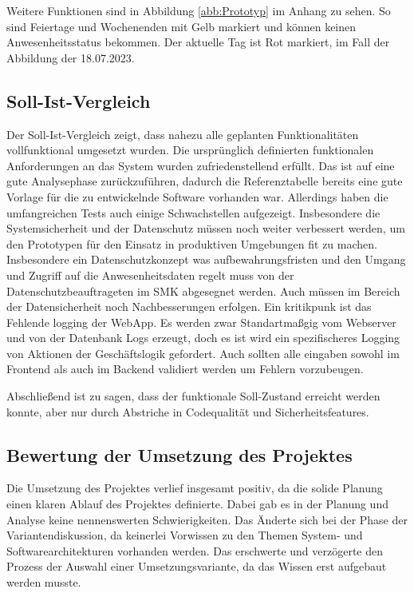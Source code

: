 Weitere Funktionen sind in Abbildung \ref{abb:Prototyp} im Anhang zu sehen. So sind \zB Feiertage und Wochenenden mit Gelb markiert und können keinen Anwesenheitsstatus bekommen. Der aktuelle Tag ist Rot markiert, im Fall der Abbildung der 18.07.2023.

\subsection{Soll-Ist-Vergleich}
\label{sec:Soll-Ist-Vergleich}
Der Soll-Ist-Vergleich zeigt, dass nahezu alle geplanten Funktionalitäten vollfunktional umgesetzt wurden. Die ursprünglich definierten funktionalen Anforderungen an das System wurden zufriedenstellend erfüllt. Das ist auf eine gute Analysephase zurückzuführen, dadurch die Referenztabelle bereits eine gute Vorlage für die zu entwickelnde Software vorhanden war. Allerdings haben die umfangreichen Tests auch einige Schwachstellen aufgezeigt. Insbesondere die Systemsicherheit und der Datenschutz müssen noch weiter verbessert werden, um den Prototypen für den Einsatz in produktiven Umgebungen fit zu machen. Insbesondere ein Datenschutzkonzept was aufbewahrungsfristen und den Umgang und Zugriff auf die Anwesenheitsdaten regelt muss von der Datenschutzbeauftrageten im SMK abgesegnet werden. Auch müssen im Bereich der Datensicherheit noch Nachbesserungen erfolgen. Ein kritikpunk ist \zB das Fehlende logging der WebApp. Es werden zwar Standartmaßgig vom Webserver und von der Datenbank Logs erzeugt, doch es ist wird ein spezifischeres Logging von Aktionen der Geschäftslogik gefordert. Auch sollten alle eingaben sowohl im Frontend als auch im Backend validiert werden um Fehlern vorzubeugen.

Abschließend ist zu sagen, dass der funktionale Soll-Zustand erreicht werden konnte, aber nur durch Abstriche in Codequalität und Sicherheitsfeatures.

\subsection{Bewertung der Umsetzung des Projektes}
\label{sec:Bewertung} %
Die Umsetzung des Projektes verlief insgesamt positiv, da die solide Planung einen klaren Ablauf des Projektes definierte. Dabei gab es in der Planung und Analyse keine nennenswerten Schwierigkeiten. Das Änderte sich bei der Phase der Variantendiskussion, da keinerlei Vorwissen zu den Themen System- und Softwarearchitekturen vorhanden werden. Das erschwerte und verzögerte den Prozess der Auswahl einer Umsetzungsvariante, da das Wissen erst aufgebaut werden musste.

